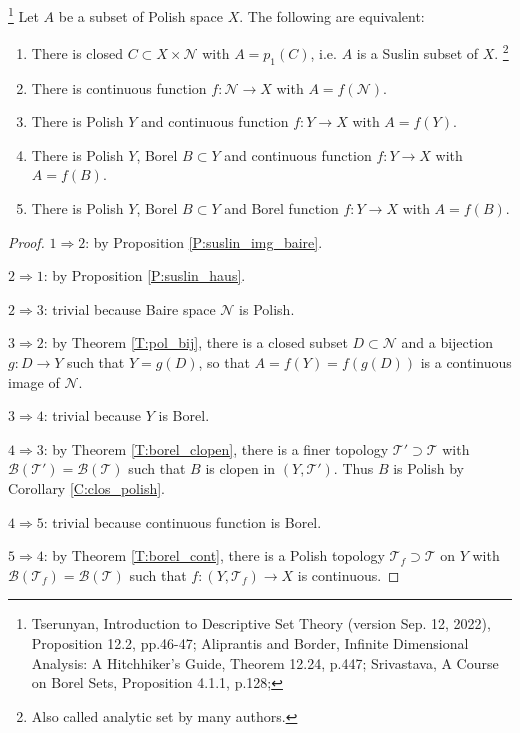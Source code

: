 \begin{proposition} \label{P:suslin_equiv_def}
  \footnote{Tserunyan, Introduction to Descriptive Set Theory (version 
   Sep. 12, 2022), Proposition 12.2, pp.46-47; 
   Aliprantis and Border, Infinite Dimensional Analysis: A Hitchhiker's 
   Guide, Theorem 12.24, p.447;
   Srivastava, A Course on Borel Sets, Proposition 4.1.1, p.128;}
Let $A$ be a subset of Polish space $X$. The following are equivalent:
\begin{enumerate}
  \item There is closed $C\subset X\times\mathcal{N}$ with $A=p_1(C)$, i.e.
        $A$ is a Suslin subset of $X$.
        \footnote{Also called analytic set by many authors.}
  \item There is continuous function $f:\mathcal{N}\to X$ with 
    $A=f(\mathcal{N})$.
  \item There is Polish $Y$ and continuous function $f:Y\to X$ with $A=f(Y)$.
  \item There is Polish $Y$, Borel $B\subset Y$ and continuous function 
    $f:Y\to X$ with $A=f(B)$.
  \item There is Polish $Y$, Borel $B\subset Y$ and Borel function 
    $f:Y\to X$ with $A=f(B)$.
\end{enumerate}
\end{proposition}
\begin{proof}
$1\Rightarrow 2$: by Proposition \ref{P:suslin_img_baire}.

$2\Rightarrow 1$: by Proposition \ref{P:suslin_haus}.

$2\Rightarrow 3$: trivial because Baire space $\mathcal{N}$ is Polish.

$3\Rightarrow 2$: by Theorem \ref{T:pol_bij}, there is a closed subset 
$D\subset\mathcal{N}$ and a bijection $g:D\to Y$ such that $Y=g(D)$,
so that $A=f(Y)=f(g(D))$ is a continuous image of $\mathcal{N}$.

$3\Rightarrow 4$: trivial because $Y$ is Borel.

$4\Rightarrow 3$: by Theorem \ref{T:borel_clopen}, there is a finer
topology $\mathcal{T}'\supset\mathcal{T}$ 
with $\mathcal{B}(\mathcal{T}')=\mathcal{B}(\mathcal{T})$ such that
$B$ is clopen in $(Y,\mathcal{T}')$. Thus $B$ is Polish by Corollary
\ref{C:clos_polish}.

$4\Rightarrow 5$: trivial because continuous function is Borel.

$5\Rightarrow 4$: by Theorem \ref{T:borel_cont},
there is a Polish topology $\mathcal{T}_f\supset \mathcal{T}$ on 
$Y$ with $\mathcal{B}(\mathcal{T}_f)=\mathcal{B}(\mathcal{T})$ such that
$f:(Y,\mathcal{T}_f)\to X$ is continuous.
\end{proof}



